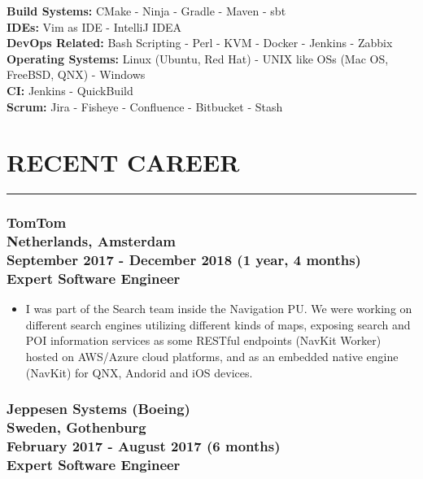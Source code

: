 \documentclass[10pt,a4paper]{article}
\begin{document}
\textbullet \hspace{0.1cm}\textbf{Build Systems:} CMake - Ninja - Gradle - Maven - sbt \\
\textbullet \hspace{0.1cm}\textbf{IDEs:} Vim as IDE - IntelliJ IDEA \\
\textbullet \hspace{0.1cm}\textbf{DevOps Related:} Bash Scripting - Perl - KVM - Docker - Jenkins - Zabbix \\
\textbullet \hspace{0.1cm}\textbf{Operating Systems:} Linux (Ubuntu, Red Hat) - UNIX like OSs (Mac OS, FreeBSD, QNX) - Windows \\
\textbullet \hspace{0.1cm}\textbf{CI:} Jenkins - QuickBuild \\
\textbullet \hspace{0.1cm}\textbf{Scrum:} Jira - Fisheye - Confluence - Bitbucket - Stash

\section{RECENT CAREER}
\noindent \rule {4.3cm}{0.4pt}
\subsubsection{{ \textbullet \hspace{0.1cm} \large TomTom} \\
\textnormal{Netherlands, Amsterdam} \\
\textnormal{September 2017 - December 2018 (1 year, 4 months)} \\
{Expert Software Engineer}}
  \setlength{\leftskip}{0.5cm}
  \setlength{\rightskip}{1cm}
  \begin{itemize}
    \setlength{\rightskip}{1cm}
    \setlength\itemsep{0em}
    \item I was part of the Search team inside the Navigation PU. We were working on different search engines utilizing different kinds of maps, exposing search and POI information services as some RESTful endpoints (NavKit Worker) hosted on AWS/Azure cloud platforms, and as an embedded native engine (NavKit) for QNX, Andorid and iOS devices.
  \end{itemize}
  \setlength{\leftskip}{0pt}
  \setlength{\rightskip}{0cm}
\vspace{0.05cm}
\subsubsection{{ \textbullet \hspace{0.1cm} \large Jeppesen Systems (Boeing)} \\
\textnormal{Sweden, Gothenburg} \\
\textnormal{February 2017 - August 2017 (6 months)} \\
{Expert Software Engineer}} \hfill
\end{document}
